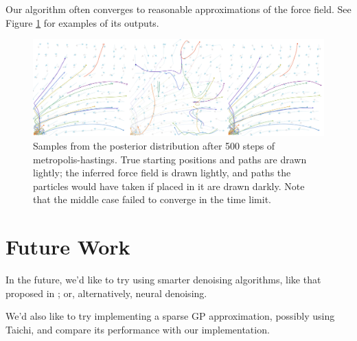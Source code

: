 \documentclass[11pt]{article}
\begin{document}
Our algorithm often converges to reasonable approximations of the force field. See Figure \ref{fig:sample} for examples of its outputs.

\begin{figure}[htbp]
\centering
\includegraphics[width=6in]{./result1.png}
\caption{\label{fig:sample}Samples from the posterior distribution after 500 steps of metropolis-hastings. True starting positions and paths are drawn lightly; the inferred force field is drawn lightly, and paths the particles would have taken if placed in it are drawn darkly. Note that the middle case failed to converge in the time limit.}
\end{figure}

\section{Future Work}
\label{sec:org377a189}
In the future, we'd like to try using smarter denoising algorithms, like that proposed in \cite{NumDiffNonsmooth}; or, alternatively, neural denoising.

We'd also like to try implementing a sparse GP approximation, possibly using Taichi, and compare its performance with our implementation.



\end{document}
